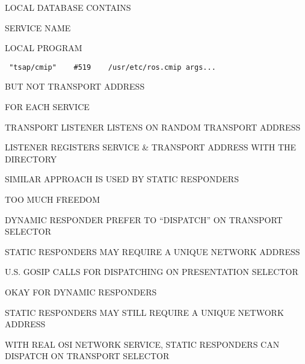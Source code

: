 \begin{bwslide}

\begin{nrtc}
\item	LOCAL DATABASE CONTAINS
	\begin{nrtc}
	\item	SERVICE NAME
	\item	LOCAL PROGRAM
	\end{nrtc}
	\begin{verbatim} "tsap/cmip"    #519    /usr/etc/ros.cmip args...  \end{verbatim}
	BUT NOT TRANSPORT ADDRESS
\item	FOR EACH SERVICE
	\begin{nrtc}
	\item	TRANSPORT LISTENER LISTENS ON RANDOM TRANSPORT ADDRESS
	\item	LISTENER REGISTERS SERVICE \& TRANSPORT ADDRESS WITH THE DIRECTORY
	\end{nrtc}
\item	SIMILAR APPROACH IS USED BY STATIC RESPONDERS
\end{nrtc}
\end{bwslide}




\begin{bwslide}

\begin{nrtc}
\item	TOO MUCH FREEDOM
\item	DYNAMIC RESPONDER PREFER TO ``DISPATCH'' ON TRANSPORT SELECTOR
\item	STATIC RESPONDERS MAY REQUIRE A UNIQUE NETWORK ADDRESS
\end{nrtc}
\end{bwslide}


\begin{bwslide}

\begin{nrtc}
\item	U.S. GOSIP CALLS FOR DISPATCHING ON PRESENTATION SELECTOR
\item	OKAY FOR DYNAMIC RESPONDERS
\item	STATIC RESPONDERS MAY STILL REQUIRE A UNIQUE NETWORK ADDRESS
	\begin{nrtc}
	\item	WITH REAL OSI NETWORK SERVICE, STATIC RESPONDERS CAN DISPATCH
		ON TRANSPORT SELECTOR
	\end{nrtc}
\end{nrtc}
\end{bwslide}
